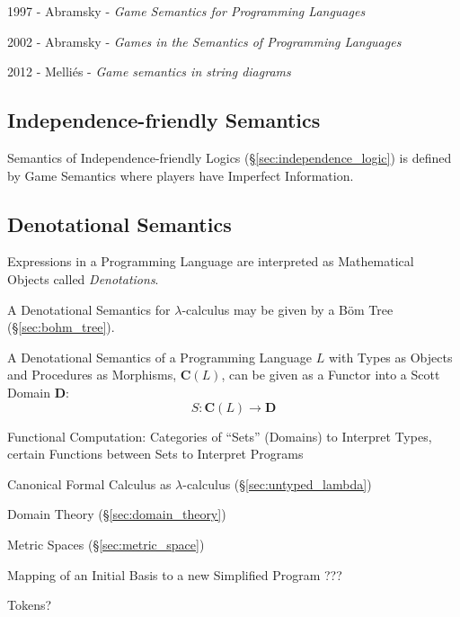1997 - Abramsky - \emph{Game Semantics for Programming Languages}

2002 - Abramsky - \emph{Games in the Semantics of Programming Languages}

2012 - Melli\'es - \emph{Game semantics in string diagrams}



\subsection{Independence-friendly Semantics}
\label{sec:independence_semantics}

Semantics of Independence-friendly Logics
(\S\ref{sec:independence_logic}) is defined by Game Semantics where
players have Imperfect Information.



\subsection{Denotational Semantics}\label{sec:denotational_semantics}

Expressions in a Programming Language are interpreted as Mathematical
Objects called \emph{Denotations}.

A Denotational Semantics for $\lambda$-calculus may be given by a
B\"om Tree (\S\ref{sec:bohm_tree}).

A Denotational Semantics of a Programming Language $L$ with Types as
Objects and Procedures as Morphisms, $\mathbf{C}(L)$, can be given as
a Functor into a Scott Domain $\mathbf{D}$: \cite{awodey06}
\[
  S : \mathbf{C}(L) \rightarrow \mathbf{D}
\]

Functional Computation: Categories of ``Sets'' (Domains) to Interpret
Types, certain Functions between Sets to Interpret Programs

Canonical Formal Calculus as $\lambda$-calculus
(\S\ref{sec:untyped_lambda})

Domain Theory (\S\ref{sec:domain_theory})

Metric Spaces (\S\ref{sec:metric_space})

Mapping of an Initial Basis to a new Simplified Program ??? %

Tokens?

